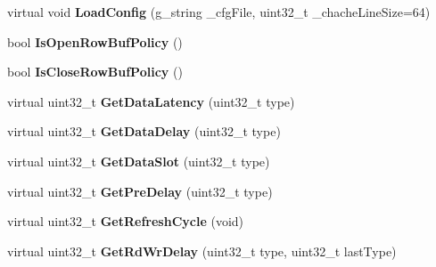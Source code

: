 \begin{DoxyCompactItemize}
\item 
\hypertarget{classMemParam_a59b1da6f168461f932bc2dc24e141227}{virtual void {\bfseries Load\-Config} (g\-\_\-string \-\_\-cfg\-File, uint32\-\_\-t \-\_\-chache\-Line\-Size=64)}\label{classMemParam_a59b1da6f168461f932bc2dc24e141227}

\item 
\hypertarget{classMemParam_a82748bb38598ad9aaebb7aa1e981a718}{bool {\bfseries Is\-Open\-Row\-Buf\-Policy} ()}\label{classMemParam_a82748bb38598ad9aaebb7aa1e981a718}

\item 
\hypertarget{classMemParam_a2809795fb8a5862894b77528df8d74a6}{bool {\bfseries Is\-Close\-Row\-Buf\-Policy} ()}\label{classMemParam_a2809795fb8a5862894b77528df8d74a6}

\item 
\hypertarget{classMemParam_ade93651b841766c75b1ad4429b72f9c3}{virtual uint32\-\_\-t {\bfseries Get\-Data\-Latency} (uint32\-\_\-t type)}\label{classMemParam_ade93651b841766c75b1ad4429b72f9c3}

\item 
\hypertarget{classMemParam_a222adb244c041f469ed6000e32026009}{virtual uint32\-\_\-t {\bfseries Get\-Data\-Delay} (uint32\-\_\-t type)}\label{classMemParam_a222adb244c041f469ed6000e32026009}

\item 
\hypertarget{classMemParam_a8464aba74cb9330301a2c50efb06fbdd}{virtual uint32\-\_\-t {\bfseries Get\-Data\-Slot} (uint32\-\_\-t type)}\label{classMemParam_a8464aba74cb9330301a2c50efb06fbdd}

\item 
\hypertarget{classMemParam_abbc6b33524ef05c8ef6a8cd8721ee6ff}{virtual uint32\-\_\-t {\bfseries Get\-Pre\-Delay} (uint32\-\_\-t type)}\label{classMemParam_abbc6b33524ef05c8ef6a8cd8721ee6ff}

\item 
\hypertarget{classMemParam_a9670b357f94edea29fa9f49955bc4279}{virtual uint32\-\_\-t {\bfseries Get\-Refresh\-Cycle} (void)}\label{classMemParam_a9670b357f94edea29fa9f49955bc4279}

\item 
\hypertarget{classMemParam_a3cd47ec3d7eaaa4ebacac9fe17110bf3}{virtual uint32\-\_\-t {\bfseries Get\-Rd\-Wr\-Delay} (uint32\-\_\-t type, uint32\-\_\-t last\-Type)}\label{classMemParam_a3cd47ec3d7eaaa4ebacac9fe17110bf3}

\end{DoxyCompactItemize}
